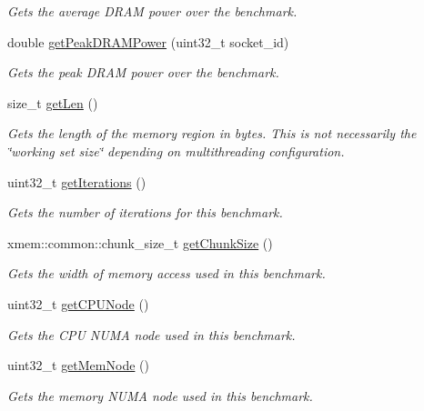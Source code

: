 \begin{DoxyCompactItemize}
\begin{DoxyCompactList}\small\item\em Gets the average D\-R\-A\-M power over the benchmark. \end{DoxyCompactList}\item 
double \hyperlink{classxmem_1_1benchmark_1_1_benchmark_a511908c2bd9bb5fa17d4b255a711636c}{get\-Peak\-D\-R\-A\-M\-Power} (uint32\-\_\-t socket\-\_\-id)
\begin{DoxyCompactList}\small\item\em Gets the peak D\-R\-A\-M power over the benchmark. \end{DoxyCompactList}\item 
size\-\_\-t \hyperlink{classxmem_1_1benchmark_1_1_benchmark_a3ca2577e4d2179710691c4aec7f93828}{get\-Len} ()
\begin{DoxyCompactList}\small\item\em Gets the length of the memory region in bytes. This is not necessarily the \char`\"{}working set size\char`\"{} depending on multithreading configuration. \end{DoxyCompactList}\item 
uint32\-\_\-t \hyperlink{classxmem_1_1benchmark_1_1_benchmark_a9fc7c775d0e29b22c8656e6e5bc10a48}{get\-Iterations} ()
\begin{DoxyCompactList}\small\item\em Gets the number of iterations for this benchmark. \end{DoxyCompactList}\item 
xmem\-::common\-::chunk\-\_\-size\-\_\-t \hyperlink{classxmem_1_1benchmark_1_1_benchmark_a434d6f97172982afdd16d3bde30e895f}{get\-Chunk\-Size} ()
\begin{DoxyCompactList}\small\item\em Gets the width of memory access used in this benchmark. \end{DoxyCompactList}\item 
uint32\-\_\-t \hyperlink{classxmem_1_1benchmark_1_1_benchmark_ad9e17919d6a8dd474495f3d7f0d05a29}{get\-C\-P\-U\-Node} ()
\begin{DoxyCompactList}\small\item\em Gets the C\-P\-U N\-U\-M\-A node used in this benchmark. \end{DoxyCompactList}\item 
uint32\-\_\-t \hyperlink{classxmem_1_1benchmark_1_1_benchmark_a35254c617874da5ccf8818692bdd0fe1}{get\-Mem\-Node} ()
\begin{DoxyCompactList}\small\item\em Gets the memory N\-U\-M\-A node used in this benchmark. \end{DoxyCompactList}\item 

\end{DoxyCompactItemize}
